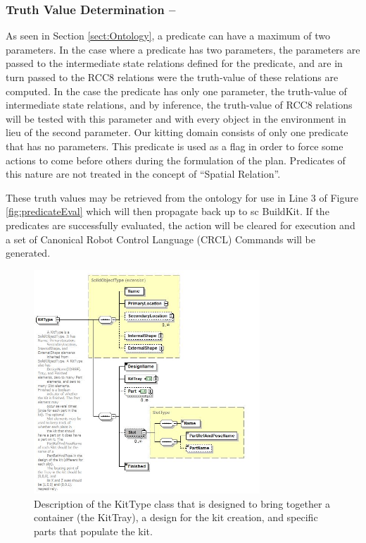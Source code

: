 \subsubsection{Truth Value Determination --}
As seen in Section \ref{sect:Ontology}, a predicate can have a maximum of two parameters. In the case where a predicate has two parameters, the parameters are passed to the intermediate state relations defined for the predicate, and are in turn passed to the RCC8 relations were the truth-value of these relations are computed. In the case the predicate has only one parameter, the truth-value of intermediate state relations, and by inference, the truth-value of RCC8 relations will be tested with this parameter and with every object in the environment in lieu of the second parameter. Our kitting domain consists of only one predicate that has no parameters. This predicate is used as a flag in order to force some actions to come before others during the formulation of the plan. Predicates of this nature are not treated in the concept of ``Spatial Relation''.

These truth values may be retrieved from the ontology for use in Line 3 of Figure
\ref{fig:predicateEval} which will then propagate back up to {sc BuildKit}. If
the predicates are successfully evaluated, the action will be cleared for 
execution and a set of Canonical Robot Control Language (CRCL) Commands will be 
generated.
%
\begin{figure}[htb!]
\begin{center}
\includegraphics[width=8.5cm]{images/Kit.jpg}
\caption{Description of the KitType class that is designed to bring together
a container (the KitTray), a design for the kit creation, and specific parts
that populate the kit.}
\label{fig:kit}
\end{center}
\end{figure}
%
